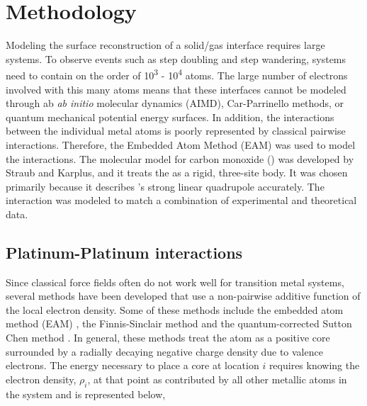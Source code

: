 \section{Methodology}
Modeling the surface reconstruction of a solid/gas interface requires large
systems.  To observe events such as step doubling and step wandering, systems
need to contain on the order of 10\textsuperscript{3} - 10\textsuperscript{4}
atoms. The large number of electrons involved with this many atoms means that
these interfaces cannot be modeled through ab {\em ab initio} molecular
dynamics (AIMD),\citep{Kresse:1993ve, Kresse:1993qf, Kresse:1994ul}
Car-Parrinello methods, \citep{Car:1985bh, Izvekov:2000fv, Guidelli:2000fy} or
quantum mechanical potential energy surfaces.  In addition, the interactions
between the individual metal atoms is poorly represented by classical pairwise
interactions.  Therefore, the Embedded Atom Method (EAM) \citep{Foiles:1986ky}
was used to model the  interactions.  The molecular model for
carbon monoxide () was developed by Straub and
Karplus,\citep{Straub:1991no} and it treats the  as a rigid, three-site
body. It was chosen primarily because it describes 's strong linear
quadrupole accurately.  The  interaction was modeled to match
a combination of experimental \citep{Ertl:1977cg, Kelemen:1979ad, Yeo:1997th}
and theoretical \citep{Feibelman:2001qa, Deshlahra:2009wu, Beurden:2002ys,
Deshlahra:2012aa, Korzeniewski:1986kl, Mason:2004ix} data. 

\subsection{Platinum-Platinum interactions}
Since classical force fields often do not work well for transition metal
systems, several methods have been developed that use a non-pairwise additive
function of the local electron density.  Some of these methods include the
embedded atom method (EAM) \citep{Foiles:1986ky, Daw:1984aq, Johnson:1989yr,
Daw:1989ci, Plimpton:1993qi, Voter:1995ax, Lu:1997fv, Alemany:1998fp}, the
Finnis-Sinclair method \citep{Finnis:1984hl, Sutton:1990rr} and the
quantum-corrected Sutton Chen method \citep{Qi:1999dn}.  In general, these
methods treat the atom as a positive core surrounded by a radially decaying
negative charge density due to valence electrons.  The energy necessary to
place a core at location $i$ requires knowing the electron density, $\rho_i$,
at that point as contributed by all other metallic atoms in the system and is
represented below, 

